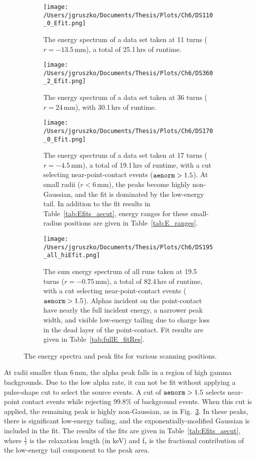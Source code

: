 \begin{figure*}[]
 \centering
  \begin{subfigure}[t]{.45\textwidth}
 \texttt{[image: /Users/jgruszko/Documents/Thesis/Plots/Ch6/DS110\_0\_Efit.png]}
  \caption{The energy spectrum of a data set taken at 11 turns ($r= -13.5$\,mm), a total of 25.1\,hrs of runtime.}
 \label{fig:Efit_110}
\end{subfigure}
\hfill
  \begin{subfigure}[t]{.45\textwidth}
 \texttt{[image: /Users/jgruszko/Documents/Thesis/Plots/Ch6/DS360\_2\_Efit.png]}
  \caption{The energy spectrum of a data set taken at 36 turns ($r = 24$\,mm), with 30.1\,hrs of runtime.}
 \label{fig:Efit_360}
\end{subfigure}
\hfill
 \begin{subfigure}[t]{.45\textwidth}
 \texttt{[image: /Users/jgruszko/Documents/Thesis/Plots/Ch6/DS170\_0\_Efit.png]}
  \caption{The energy spectrum of a data set taken at 17 turns ($r = -4.5$\,mm), a total of 19.1\,hrs of runtime, with a cut selecting near-point-contact events (${\tt aenorm} > 1.5$). At small radii ($r<6$\,mm), the peaks become highly non-Gaussian, and the fit is dominated by the low-energy tail. In addition to the fit results in Table~\ref{tab:Efits_aecut}, energy ranges for these small-radius positions are given in Table~\ref{tab:E_ranges}.}
 \label{fig:Efit_170}
\end{subfigure}
\hfill
 \begin{subfigure}[t]{.45\textwidth}
 \texttt{[image: /Users/jgruszko/Documents/Thesis/Plots/Ch6/DS195\_all\_hiEfit.png]}
 \caption{The sum energy spectrum of all runs taken at 19.5 turns ($r = -0.75$\,mm), a total of 82.4\,hrs of runtime, with a cut selecting near-point-contact events (${\tt aenorm} > 1.5$). Alphas incident on the point-contact have nearly the full incident energy, a narrower peak width, and visible low-energy tailing due to charge loss in the dead layer of the point-contact. Fit results are given in Table~\ref{tab:fullE_fitRes}.}
 \label{fig:Efit_195}
\end{subfigure}
 \caption{The energy spectra and peak fits for various scanning positions.} 
 \label{fig:Epeaks}
\end{figure*}

At radii smaller than 6\,mm, the alpha peak falls in a region of high gamma backgrounds. Due to the low alpha rate, it can not be fit without applying a pulse-shape cut to select the source events. A cut of ${\tt aenorm} >1.5$ selects near-point contact events while rejecting 99.8\% of background events. When this cut is applied, the remaining peak is highly non-Gaussian, as in Fig.~\ref{fig:Efit_170}. In these peaks, there is significant low-energy tailing, and the exponentially-modified Gaussian is included in the fit. The results of the fits are given in Table~\ref{tab:Efits_aecut}, where $\frac{1}{\tau}$ is the relaxation length (in keV) and  f$_{\tau}$ is the fractional contribution of the low-energy tail component to the peak area.

